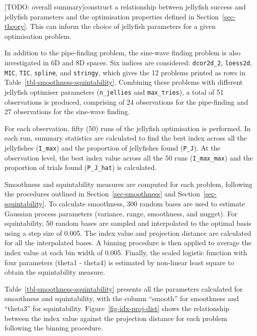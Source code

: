 \documentclass[
  number,
  preprint,
  3p]{elsarticle}
\begin{document}
{[}TODO: overall summary{]}construct a relationship between jellyfish
success and jellyfish parameters and the optimisation properties defined
in Section~\ref{sec-theory}. This can inform the choice of jellyfish
parameters for a given optimisation problem.

In addition to the pipe-finding problem, the sine-wave finding problem
is also investigated in 6D and 8D spaces. Six indices are considered:
\texttt{dcor2d\_2}, \texttt{loess2d}, \texttt{MIC}, \texttt{TIC},
\texttt{spline}, and \texttt{stringy}, which gives the 12 problems
printed as rows in Table~\ref{tbl-smoothness-squintability}. Combining
these problems with different jellyfish optimiser parameters
(\texttt{n\_jellies} and \texttt{max\_tries}), a total of 51
observations is produced, comprising of 24 observations for the
pipe-finding and 27 observations for the sine-wave finding.

For each observation, fifty (50) runs of the jellyfish optimisation is
performed. In each run, summary statistics are calculated to find the
best index across all the jellyfishes (\texttt{I\_max}) and the
proportion of jellyfishes found (\texttt{P\_J}). At the observation
level, the best index value across all the 50 runs
(\texttt{I\_max\_max}) and the proportion of trials found
(\texttt{P\_J\_hat}) is calculated.

Smoothness and squintability measures are computed for each problem,
following the procedures outlined in Section~\ref{sec-smoothness} and
Section~\ref{sec-squintability}. To calculate smoothness, 300 random
bases are used to estimate Gaussian process parameters (variance, range,
smoothness, and nugget). For squintability, 50 random bases are sampled
and interpolated to the optimal basis using a step size of 0.005. The
index value and projection distance are calculated for all the
interpolated bases. A binning procedure is then applied to average the
index value at each bin width of 0.005. Finally, the scaled logistic
function with four parameters (theta1 - theta4) is estimated by
non-linear least square to obtain the squintability measure.

Table~\ref{tbl-smoothness-squintability} presents all the parameters
calculated for smoothness and squintability, with the column ``smooth''
for smoothness and ``theta3'' for squintability.
Figure~\ref{fig-idx-proj-dist} shows the relationship between the index
value against the projection distance for each problem following the
binning procedure.
\end{document}
